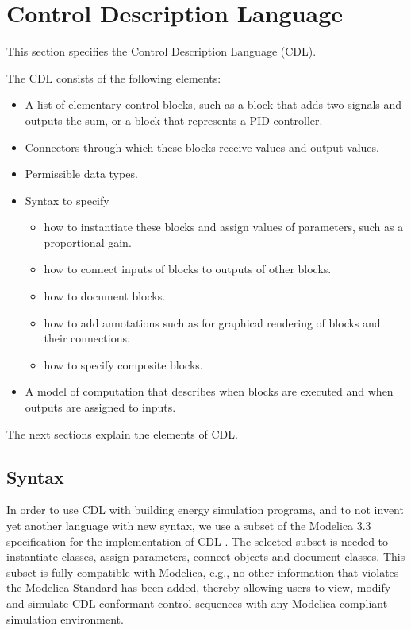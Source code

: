 \documentclass[letterpaper,10pt, openany,english]{sphinxmanual}
\begin{document}
\chapter{Control Description Language}
\label{\detokenize{cdl:control-description-language}}\label{\detokenize{cdl:sec-cdl}}\label{\detokenize{cdl::doc}}
This section specifies
the Control Description Language (CDL).

The CDL consists of the following elements:
\begin{itemize}
\item {} 
A list of elementary control blocks, such as a block that adds two signals and outputs the sum,
or a block that represents a PID controller.

\item {} 
Connectors through which these blocks receive values and output values.

\item {} 
Permissible data types.

\item {} 
Syntax to specify
\begin{itemize}
\item {} 
how to instantiate these blocks and assign values of parameters, such as a proportional gain.

\item {} 
how to connect inputs of blocks to outputs of other blocks.

\item {} 
how to document blocks.

\item {} 
how to add annotations such as for graphical rendering of blocks
and their connections.

\item {} 
how to specify composite blocks.

\end{itemize}

\item {} 
A model of computation that describes when blocks are executed and when
outputs are assigned to inputs.

\end{itemize}

The next sections explain the elements of CDL.


\section{Syntax}
\label{\detokenize{cdl:syntax}}
In order to use CDL with building energy simulation programs,
and to not invent yet another language with new syntax, we use
a subset of the Modelica 3.3 specification
for the implementation of CDL .
The selected subset is needed to instantiate
classes, assign parameters, connect objects and document classes.
This subset is fully compatible with Modelica, e.g., no other information that
violates the Modelica Standard has been added, thereby allowing users
to view, modify and simulate CDL-conformant control sequences with any
Modelica-compliant simulation environment.
\end{document}
